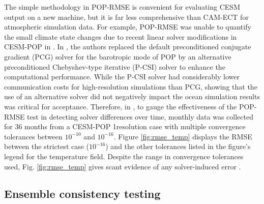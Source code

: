 \documentclass[gmd, manuscript]{copernicus}
\begin{document}
The simple methodology in POP-RMSE is convenient for evaluating CESM output on a new machine, but it is far less comprehensive than CAM-ECT for atmospheric simulation data. For example, POP-RMSE was unable to quantify the small climate state changes due to recent linear solver modifications in CESM-POP in \cite{yong2015}.
In \cite{yong2015}, the authors replaced the default preconditioned conjugate gradient (PCG) solver for the barotropic mode of POP by an alternative preconditioned Chebyshev-type iterative (P-CSI) solver to enhance the computational performance.  While the P-CSI solver had considerably lower communication costs for high-resolution simulations than PCG, showing that the use of an alternative solver did not negatively impact the ocean simulation results was critical for acceptance.  Therefore, in \cite{yong2015}, to gauge the effectiveness of the POP-RMSE test in detecting solver differences over time, monthly data was collected for 36 months from a CESM-POP 1\degree\space resolution case with multiple convergence tolerances between $10^{-10}$ and $10^{-16}$.  Figure \ref{fig:rmse_temp} displays the RMSE between the strictest case ($10^{-16}$) and the other tolerances listed in the figure's legend for the temperature field.  Despite the range in convergence tolerances used, Fig. \ref{fig:rmse_temp} gives scant evidence of any solver-induced error \citep{yong2015}.  


\subsection{Ensemble consistency testing}
\end{document}
